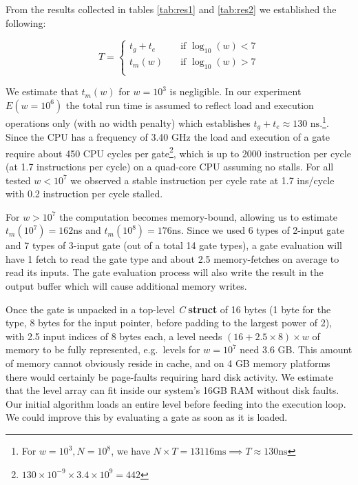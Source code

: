 \par
From the results collected in tables \ref{tab:res1} and \ref{tab:res2} we established the following:

\[ T =
  \begin{cases}
    t_g + t_e       & \quad \text{if } \log_{10}(w) < 7\\
    t_m(w) & \quad \text{if } \log_{10}(w) > 7\\
  \end{cases}
\]

We estimate that $t_m(w)$ for $w = 10^3$ is negligible. In our experiment $E(w = 10^6)$ the total run time is assumed to reflect load and execution operations only (with no width penalty) which establishes $t_g + t_e \approx 130\text{ ns}$.\footnote{ For $w = 10^3, N=10^8$, we have $N \times T = 13116 \text{ms} \implies T \approx 130 \text{ns}$ }. 
Since the CPU has a frequency of 3.40 GHz the load and execution of a gate require about 450 CPU cycles per gate\footnote{$130 \times 10^{-9} \times 3.4 \times 10^9 = 442$}, which is up to 2000 instruction per cycle (at 1.7 instructions per cycle) on a quad-core CPU assuming no stalls. For all tested $w < 10^7$ we observed a stable instruction per cycle rate at 1.7 ins/cycle with 0.2 instruction per cycle stalled.
\par
For $ w > 10^7$ the computation becomes memory-bound, allowing us to estimate $t_m(10^7) = 162$ns and $t_m(10^8) = 176$ns. Since we used 6 types of 2-input gate and 7 types of 3-input gate (out of a total 14 gate types), a gate evaluation will have 1 fetch to read the gate type and about 2.5 memory-fetches on average to read its inputs. The gate evaluation process will also write the result in the output buffer which will cause additional memory writes. 
\par
Once the gate is unpacked in a top-level \textit{C} \textbf{struct} of 16 bytes (1 byte for the type, 8 bytes for the input pointer, before padding to the largest power of 2), with 2.5 input indices of 8 bytes each, a level needs $ (16 + 2.5 \times 8) \times w $ of memory to be fully represented, e.g.\ levels for $w = 10^7$ need 3.6 GB. This amount of memory cannot obviously reside in cache, and on 4 GB memory platforms there would certainly be page-faults requiring hard disk activity. We estimate that the level array can fit inside our system's 16GB RAM without disk faults. Our initial algorithm loads an entire level before feeding into the execution loop. We could improve this by evaluating a gate as soon as it is loaded.  
\par
